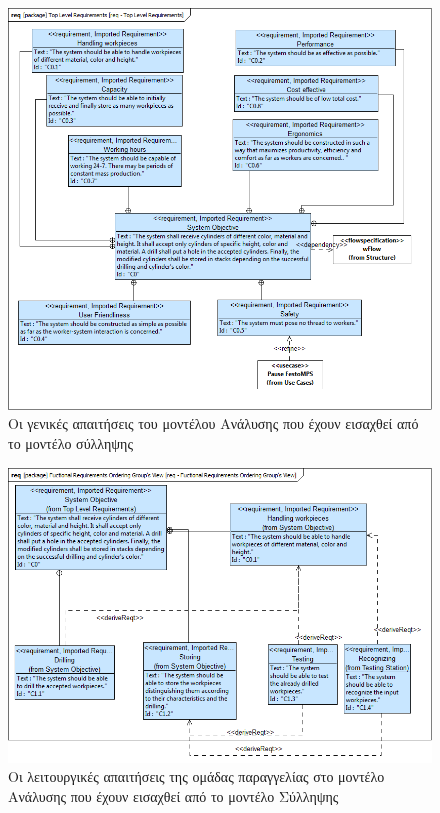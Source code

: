 \documentclass[a4paper,12pt,twoside]{report}
\begin{document}
{\begin{appendices}
			\begin{figure}[hp]
					\centering
					\includegraphics[scale=0.45]{AnalysisModel_req-TopLevelRequirements.png}
					\caption{Οι γενικές απαιτήσεις του μοντέλου Ανάλυσης που έχουν εισαχθεί από το μοντέλο σύλληψης}
					\label{φωτ:Οι γενικές απαιτήσεις του μοντέλου Ανάλυσης που έχουν εισαχθεί από το μοντέλο σύλληψης}
			\end{figure}
				
			\begin{figure}[hp]
					\centering
					\includegraphics[scale=0.45]{AnalysisModel_req-FuctionalRequirementsOrderingGroupsView.png}
					\caption{Οι λειτουργικές απαιτήσεις της ομάδας παραγγελίας στο μοντέλο Ανάλυσης που έχουν εισαχθεί από το μοντέλο Σύλληψης}
					\label{φωτ:Οι λειτουργικές απαιτήσεις της ομάδας παραγγελίας στο μοντέλο Ανάλυσης που έχουν εισαχθεί από το μοντέλο Σύλληψης}
			\end{figure}
				

\end{appendices}}
\end{document}
